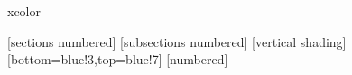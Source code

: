 
\usepackage[brazil]{babel} %
\usepackage[T1]{fontenc} 
\usepackage{lmodern} %


\usepackage{tabulary} %
\usepackage{booktabs} %
\usepackage{table}{xcolor} %
\usepackage{caption} %



\usepackage{listings}


\usepackage{amsmath}
\usepackage{amssymb}
\usepackage{amsfonts}


\usepackage{url} %


\captionsetup{justification=centering,labelfont=bf} %

[sections numbered]
[subsections numbered]
[vertical shading][bottom=blue!3,top=blue!7]
[numbered]
